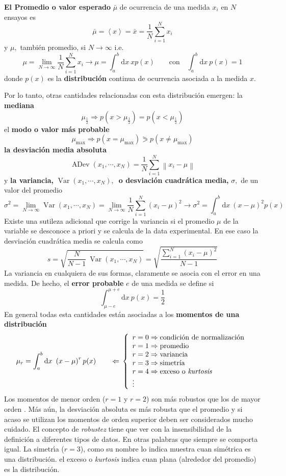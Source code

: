 \documentclass[spanish,titlepage,11pt]{article}
\begin{document}
\textbf{El Promedio o valor esperado }$\bar{\mu}$ de ocurrencia de una medida
$x_{i}$ en $N$ ensayos es
\[
\bar{\mu}=\left\langle x\right\rangle =\bar{x}=\frac{1}{N}\sum_{i=1}^{N}x_{i}
\]
y $\mu,$ tambi\'{e}n promedio, si $N\rightarrow\infty$ i.e.
\[
\mu=\lim_{N\rightarrow\infty}\frac{1}{N}\sum_{i=1}^{N}x_{i}\rightarrow\mu
=\int_{a}^{b}\mathrm{d}x\ xp(x)\qquad\mathrm{con}\quad\int_{a}^{b}%
\mathrm{d}x\ p(x)=1
\]
donde $p(x)$ es la \textbf{distribuci\'{o}n} continua de ocurrencia asociada a
la medida $x.$

Por lo tanto, otras cantidades relacionadas con esta distribuci\'{o}n emergen:
la \textbf{mediana}
\[
\mu_{\frac{1}{2}}\Rightarrow p(x>\mu_{\frac{1}{2}})=p(x<\mu_{\frac{1}{2}})
\]
el \textbf{modo o valor m\'{a}s probable}
\[
\mu_{\max}\Rightarrow p(x=\mu_{\max})\eqslantgtr p(x\neq\mu_{\max})
\]
\textbf{la desviaci\'{o}n media absoluta}
\[
\operatorname{ADev}(x_{1},\cdots,x_{N})=\frac{1}{N}\sum_{i=1}^{N}\left\|
x_{i}-\mu\right\|
\]
y \textbf{la variancia, }$\operatorname{Var}(x_{1},\cdots,x_{N}),$\textbf{\ o
desviaci\'{o}n cuadr\'{a}tica media,} $\sigma,$ de un valor del promedio
\[
\sigma^{2}=\lim_{N\rightarrow\infty}\operatorname{Var}(x_{1},\cdots
,x_{N})=\lim_{N\rightarrow\infty}\frac{1}{N}\sum_{i=1}^{N}\left(  x_{i}%
-\mu\right)  ^{2}\rightarrow\sigma^{2}=\int_{a}^{b}\mathrm{d}x\ \left(
x-\mu\right)  ^{2}p(x)
\]
Existe una sutileza adicional que corrige la variancia si el promedio $\mu$ de
la variable se desconoce a priori y se calcula de la data experimental. En ese
caso la desviaci\'{o}n cuadr\'{a}tica media se calcula como
\[
s=\sqrt{\frac{N}{N-1}\ \operatorname{Var}(x_{1},\cdots,x_{N})}=\sqrt
{\frac{\sum_{i=1}^{N}\left(  x_{i}-\mu\right)  ^{2}}{N-1}}
\]
La variancia en cualquiera de sus formas, claramente se asocia con el error en
una medida. De hecho, el \textbf{error probable }$e$ de una medida se define
si
\[
\int_{\mu-e}^{\mu+e}\mathrm{d}x\ p(x)=\frac{1}{2}
\]
En general todas esta cantidades est\'{a}n asociadas a los \textbf{momentos de
una distribuci\'{o}n}
\[
\mu_{r}=\int_{a}^{b}\mathrm{d}x\ \left(  x-\mu\right)  ^{r}p(x)\qquad
\Leftarrow\,\left\{
\begin{array}
[c]{l}%
r=0\Rightarrow\text{condici\'{o}n de normalizaci\'{o}n}\\
r=1\Rightarrow\text{promedio}\\
r=2\Rightarrow\text{variancia}\\
r=3\Rightarrow\text{simetr\'{\i}a}\\
r=4\Rightarrow\text{exceso o \textit{kurtosis}}\\
\vdots
\end{array}
\right.
\]
Los momentos de menor orden ($r=1$ y $r=2$) son m\'{a}s robustos que los de
mayor orden . M\'{a}s a\'{u}n, la desviaci\'{o}n absoluta es m\'{a}s robusta
que el promedio y si acaso se utilizan los momentos de orden superior deben
ser considerados mucho cuidado. El concepto de \textit{robustez} tiene que ver
con la insensibilidad de la definici\'{o}n a diferentes tipos de datos. En
otras palabras que siempre se comporta igual. La simetr\'{\i}a ($r=3$), como
su nombre lo indica muestra cuan sim\'{e}trica es una distribuci\'{o}n. el
exceso o \textit{kurtosis} indica cuan plana (alrededor del promedio) es la
distribuci\'{o}n.
\end{document}
